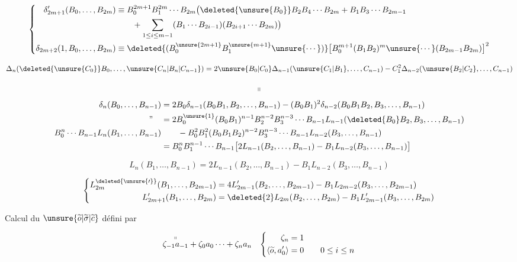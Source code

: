 \[
\left\{\begin{aligned}
\delta'_{2m+1}(B_0,\ldots,B_{2m})&\equiv B_0^{2m+1}B_1^{2m}\cdots B_{2m}\bigl(\deleted{\unsure{B_0}}B_2 B_4\cdots B_{2m}+ B_1B_3\cdots B_{2m-1}\\
&\qquad+\sum_{1\le i\le m-1}(B_1\cdots B_{2i-1})(B_{2i+1}\cdots B_{2m})\bigr)\\
\delta_{2m+2}(1,B_0,\ldots,B_{2m})&\equiv\deleted{(B_0^{\unsure{2m+1}}B_1^{\unsure{m+1}}\unsure{\cdots})}
\bigl[B_0^{m+1}(B_1 B_2)^m\unsure{\cdots}(B_{2m-1}B_{2m})\bigr]^2
\end{aligned}\right.
\]


\[
\Delta_n(\deleted{\unsure{C_0}}B_0,\ldots,\unsure{C_n|B_n|C_{n-1}})
=2\unsure{B_0|C_0}\Delta_{n-1}(\unsure{C_1|B_1},\ldots,C_{n-1})-C_1^2\Delta_{n-2}(\unsure{B_2|C_2},\ldots,C_{n-1})
\]

\[
\shortparallel
\]
\[
\begin{aligned}
\delta_n(B_0,\ldots,B_{n-1})&=2B_0\delta_{n-1}(B_0B_1,B_2,\ldots,B_{n-1})-(B_0B_1)^2\delta_{n-2}(B_0B_1B_2,B_3,\ldots,B_{n-1})\\
\text{''}\quad &=2B_0^{\unsure{1}}(B_0B_1)^{n-1}B_2^{n-2}B_3^{n-3}\cdots B_{n-1}L_{n-1}(\deleted{B_0}B_2,B_3,\ldots,B_{n-1})\\
B_0^n\cdots B_{n-1}L_n(B_1,\ldots,B_{n-1})&\qquad-B_0^2B_1^2(B_0 B_1 B_2)^{n-2}B_3^{n-3}\cdots B_{n-1}L_{n-2}(B_3,\ldots,B_{n-1})\\
&=B_0^n B_1^{n-1}\cdots B_{n-1}\bigl[2L_{n-1}(B_2,\ldots,B_{n-1})-B_1L_{n-2}(B_3,\ldots,B_{n-1})\bigr]
\end{aligned}
\]

\[
\boxed{L_n(B_1,\ldots,B_{n-1})=2L_{n-1}(B_2,\ldots,B_{n-1})-B_1 L_{n-2}(B_3,\ldots,B_{n-1})}
\]

\[
\left\{\begin{aligned}
L_{2m}^{\deleted{\unsure{\prime}}}(B_1,\ldots,B_{2m-1})&=4L'_{2m-1}(B_2,\ldots,B_{2m-1})-B_1L_{2m-2}(B_3,\ldots,B_{2m-1})\\
L'_{2m+1}(B_1,\ldots,B_{2m})&=\deleted{2}L_{2m}(B_2,\ldots,B_{2m})-B_1L'_{2m-1}(B_3,\ldots,B_{2m})
\end{aligned}\right.
\]

Calcul du $\unsure{\widetilde{o}|\widetilde{\sigma}|\widetilde{c}}$ défini par

\[
\begin{aligned}
&\overset{\shortparallel}{\zeta_{-1}a_{-1}}+\zeta_0a_0\cdots+\zeta_n a_n
&\left\{\begin{aligned}\zeta_n&=1\\ \langle\widetilde{o},a_{0}^{\prime}\rangle&=0\qquad 0\le i\le n\end{aligned}\right.
\end{aligned}
\]

